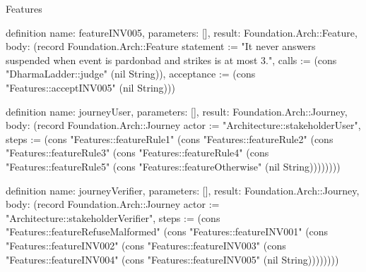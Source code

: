 \begin{lexlean}{Features}
\begin{semanticmodule}
definition{
  name: featureINV005,
  parameters: [],
  result: Foundation.Arch::Feature,
  body: (record Foundation.Arch::Feature {statement := "It never answers suspended when event is pardonbad and strikes is at most 3.", calls := (cons "DharmaLadder::judge" (nil String)), acceptance := (cons "Features::acceptINV005" (nil String))})
}

definition{
  name: journeyUser,
  parameters: [],
  result: Foundation.Arch::Journey,
  body: (record Foundation.Arch::Journey {actor := "Architecture::stakeholderUser", steps := (cons "Features::featureRule1" (cons "Features::featureRule2" (cons "Features::featureRule3" (cons "Features::featureRule4" (cons "Features::featureRule5" (cons "Features::featureOtherwise" (nil String)))))))})
}

definition{
  name: journeyVerifier,
  parameters: [],
  result: Foundation.Arch::Journey,
  body: (record Foundation.Arch::Journey {actor := "Architecture::stakeholderVerifier", steps := (cons "Features::featureRefuseMalformed" (cons "Features::featureINV001" (cons "Features::featureINV002" (cons "Features::featureINV003" (cons "Features::featureINV004" (cons "Features::featureINV005" (nil String)))))))})
}
\end{semanticmodule}
\end{lexlean}
